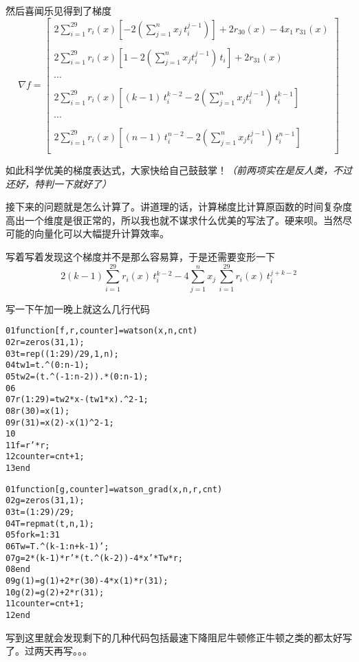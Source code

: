 \documentclass[a4paper, 11pt]{article}
\begin{document}
然后喜闻乐见得到了梯度
\begin{equation}
\nabla f= 
\begin{bmatrix}
2\sum_{i=1}^{29}r_i(x)\left[-2\left(\sum_{j=1}^nx_j\,t_i^{j-1}\right)\right]+2r_{30}(x)-4x_1\,r_{31}(x)\\\\
2\sum_{i=1}^{29}r_i(x)\left[1-2\left(\sum_{j=1}^nx_jt_i^{j-1}\right)\,t_i\right]+2r_{31}(x)\\\\
\cdots\\\\
2\sum_{i=1}^{29}r_i(x)\left[(k-1)\,t_i^{k-2}-2\left(\sum_{j=1}^nx_jt_i^{j-1}\right)\,t_i^{k-1}\right]\\\\
\cdots\\\\
2\sum_{i=1}^{29}r_i(x)\left[(n-1)\,t_i^{n-2}-2\left(\sum_{j=1}^nx_jt_i^{j-1}\right)\,t_i^{n-1}\right]\\
\end{bmatrix}
\end{equation}

如此科学优美的梯度表达式，大家快给自己鼓鼓掌！\textsl{（前两项实在是反人类，不过还好，特判一下就好了）}

接下来的问题就是怎么计算了。讲道理的话，计算梯度比计算原函数的时间复杂度高出一个维度是很正常的，所以我也就不谋求什么优美的写法了。硬来呗。当然尽可能的向量化可以大幅提升计算效率。

写着写着发现这个梯度并不是那么容易算，于是还需要变形一下
\[2(k-1)\sum_{i=1}^{29}r_i(x)\,t_i^{k-2}-4\sum_{j=1}^nx_j\,\sum_{i=1}^{29}r_i(x)\,t_i^{j+k-2}\]

写一下午加一晚上就这么几行代码

\begin{alltt}
01 \textcolor{keyword}{function} [f, r, counter] = watson(x, n, cnt)
02     r = zeros(31, 1);
03     t = rep((1:29) / 29, 1, n);
04     tw1 = t .\^{} (0:n-1);
05     tw2 = (t .\^{} (-1:n-2)) .* (0:n-1);
06     
07     r(1:29) = tw2 * x - (tw1 * x) .\^{} 2 - 1;
08     r(30) = x(1);
09     r(31) = x(2) - x(1) \^{} 2 - 1;
10     
11     f = r' * r;
12     counter = cnt + 1;
13 \textcolor{keyword}{end}
\end{alltt}

\begin{alltt}
01 \textcolor{keyword}{function} [g, counter] = watson\_grad(x, n, r, cnt)
02     g = zeros(31, 1);
03     t = (1:29) / 29;
04     T = repmat(t, n, 1);
05     \textcolor{keyword}{for} k = 1:31
06         Tw = T .\^{} (k-1:n+k-1)';
07         g = 2 * (k - 1) * r' * (t .\^{} (k - 2)) - 4 * x' * Tw * r;
08     \textcolor{keyword}{end}
09     g(1) = g(1) + 2 * r(30) - 4 * x(1) * r(31);
10     g(2) = g(2) + 2 * r(31);
11     counter = cnt + 1;
12 \textcolor{keyword}{end}
\end{alltt}

写到这里就会发现剩下的几种代码包括最速下降阻尼牛顿修正牛顿之类的都太好写了。过两天再写。。。
\end{document}

